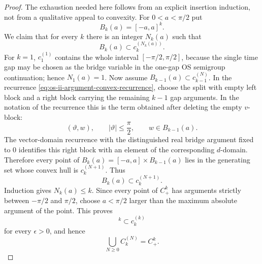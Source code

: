 \begin{proof}
The exhaustion needed here follows from an explicit insertion induction, not
from a qualitative appeal to convexity.  For \(0<a<\pi/2\) put
\[
  B_k(a)=[-a,a]^k .
\]
We claim that for every \(k\) there is an integer \(N_k(a)\) such that
\[
  B_k(a)\subset c_k^{(N_k(a))}.
\]
For \(k=1\), \(c_1^{(1)}\) contains the whole interval
\([-\pi/2,\pi/2]\), because the single time gap may be chosen as the bridge
variable in the one-gap OS semigroup continuation; hence \(N_1(a)=1\).  Now
assume \(B_{k-1}(a)\subset c_{k-1}^{(N)}\).  In the recurrence
\eqref{eq:os-ii-argument-convex-recurrence}, choose the split with empty left
block and a right block carrying the remaining \(k-1\) gap arguments.  In the
notation of the recurrence this is the term obtained after deleting the
empty \(v\)-block:
\[
  (\vartheta,w),
  \qquad
  |\vartheta|\le\frac{\pi}{2},
  \qquad
  w\in B_{k-1}(a).
\]
The vector-domain recurrence with the distinguished real bridge argument
fixed to \(0\) identifies this right block with an element of the
corresponding \(d\)-domain.  Therefore every point of
\(B_k(a)=[-a,a]\times B_{k-1}(a)\) lies in the generating set whose convex
hull is \(c_k^{(N+1)}\).  Thus
\[
  B_k(a)\subset c_k^{(N+1)} .
\]
Induction gives \(N_k(a)\le k\).  Since every point of \(C_+^k\) has arguments
strictly between \(-\pi/2\) and \(\pi/2\), choose
\(a<\pi/2\) larger than the maximum absolute argument of the point.  This
proves
\begin{equation}
  [-\frac{\pi}{2}+\epsilon,\frac{\pi}{2}-\epsilon]^k
  \subset c_k^{(k)}
  \label{eq:os-ii-domain-exhaustion-box}
\end{equation}
for every \(\epsilon>0\), and hence
\[
  \bigcup_{N\ge0}C_k^{(N)}=C_+^k .
\]


\end{proof}

